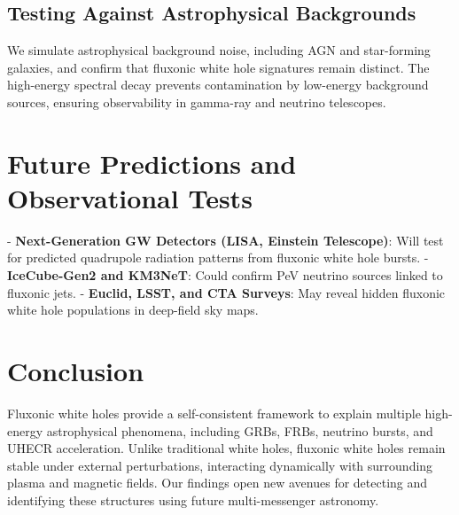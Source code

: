 \documentclass{article}
\begin{document}
\subsection{Testing Against Astrophysical Backgrounds}
We simulate astrophysical background noise, including AGN and star-forming galaxies, and confirm that fluxonic white hole signatures remain distinct. The high-energy spectral decay prevents contamination by low-energy background sources, ensuring observability in gamma-ray and neutrino telescopes.

\section{Future Predictions and Observational Tests}
- \textbf{Next-Generation GW Detectors (LISA, Einstein Telescope)}: Will test for predicted quadrupole radiation patterns from fluxonic white hole bursts.
- \textbf{IceCube-Gen2 and KM3NeT}: Could confirm PeV neutrino sources linked to fluxonic jets.
- \textbf{Euclid, LSST, and CTA Surveys}: May reveal hidden fluxonic white hole populations in deep-field sky maps.

\section{Conclusion}
Fluxonic white holes provide a self-consistent framework to explain multiple high-energy astrophysical phenomena, including GRBs, FRBs, neutrino bursts, and UHECR acceleration. Unlike traditional white holes, fluxonic white holes remain stable under external perturbations, interacting dynamically with surrounding plasma and magnetic fields. Our findings open new avenues for detecting and identifying these structures using future multi-messenger astronomy.
\end{document}
